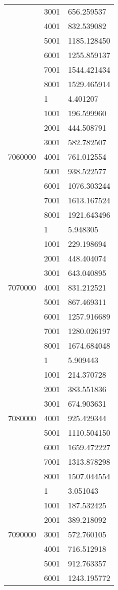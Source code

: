 \begin{table}[htb!]
\begin{tabular}{lll}
 & 3001 & 656.259537 \\
 & 4001 & 832.539082 \\
 & 5001 & 1185.128450 \\
 & 6001 & 1255.859137 \\
 & 7001 & 1544.421434 \\
 & 8001 & 1529.465914 \\
\multirow[c]{9}{*}{7060000} & 1 & 4.401207 \\
 & 1001 & 196.599960 \\
 & 2001 & 444.508791 \\
 & 3001 & 582.782507 \\
 & 4001 & 761.012554 \\
 & 5001 & 938.522577 \\
 & 6001 & 1076.303244 \\
 & 7001 & 1613.167524 \\
 & 8001 & 1921.643496 \\
\multirow[c]{9}{*}{7070000} & 1 & 5.948305 \\
 & 1001 & 229.198694 \\
 & 2001 & 448.404074 \\
 & 3001 & 643.040895 \\
 & 4001 & 831.212521 \\
 & 5001 & 867.469311 \\
 & 6001 & 1257.916689 \\
 & 7001 & 1280.026197 \\
 & 8001 & 1674.684048 \\
\multirow[c]{9}{*}{7080000} & 1 & 5.909443 \\
 & 1001 & 214.370728 \\
 & 2001 & 383.551836 \\
 & 3001 & 674.903631 \\
 & 4001 & 925.429344 \\
 & 5001 & 1110.504150 \\
 & 6001 & 1659.472227 \\
 & 7001 & 1313.878298 \\
 & 8001 & 1507.044554 \\
\multirow[c]{9}{*}{7090000} & 1 & 3.051043 \\
 & 1001 & 187.532425 \\
 & 2001 & 389.218092 \\
 & 3001 & 572.760105 \\
 & 4001 & 716.512918 \\
 & 5001 & 912.763357 \\
 & 6001 & 1243.195772 \\

\end{tabular}
\end{table}

